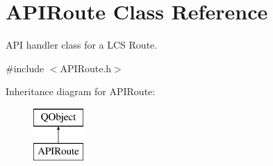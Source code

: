 \hypertarget{class_a_p_i_route}{}\section{A\+P\+I\+Route Class Reference}
\label{class_a_p_i_route}


A\+PI handler class for a L\+CS Route.  




{\ttfamily \#include $<$A\+P\+I\+Route.\+h$>$}

Inheritance diagram for A\+P\+I\+Route\+:\begin{figure}[H]
\begin{center}
\leavevmode
\includegraphics[height=2.000000cm]{class_a_p_i_route}
\end{center}
\end{figure}
